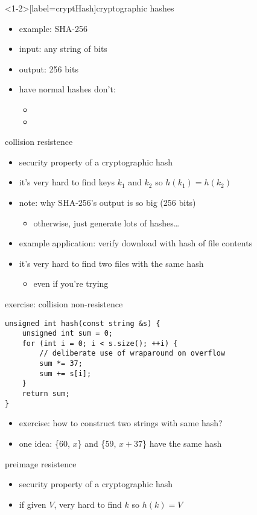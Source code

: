 \begin{frame}<1-2>[label=cryptHash]{cryptographic hashes}
\begin{itemize}
\item example: SHA-256
\item input: any string of bits
\item output: 256 bits
\vspace{.5cm}
\item have  normal hashes don't:
\begin{itemize}
    \item {}
    \item {}
\end{itemize}
\end{itemize}
\end{frame}

\begin{frame}{collision resistence}
\begin{itemize}
\item security property of a cryptographic hash
\item it's very  hard to find keys $k_1$ and $k_2$ so $h(k_1) = h(k_2)$
\vspace{.5cm}
\item note: why SHA-256's output is so big (256 bits)
    \begin{itemize}
    \item otherwise, just generate lots of hashes\ldots
    \end{itemize}
\item example application: verify download with hash of file contents
\item it's very hard to find two files with the same hash
\begin{itemize}
\item even if you're trying
\end{itemize}
\end{itemize}
\end{frame}

\begin{frame}[fragile,label=colNonRes]{exercise: collision non-resistence}
\begin{lstlisting}
unsigned int hash(const string &s) {
    unsigned int sum = 0;
    for (int i = 0; i < s.size(); ++i) {
        // deliberate use of wraparound on overflow
        sum *= 37;
        sum += s[i];
    }
    return sum;
}
\end{lstlisting}
\begin{itemize}
\item exercise: how to construct two strings with same hash?
\item<2-> one idea: \{60, $x$\} and \{59, $x+37$\} have the same hash
\end{itemize}
\end{frame}


\begin{frame}{preimage resistence}
\begin{itemize}
\item security property of a cryptographic hash
\item if given $V$, very hard to find $k$ so $h(k) = V$
\end{itemize}
\end{frame}
